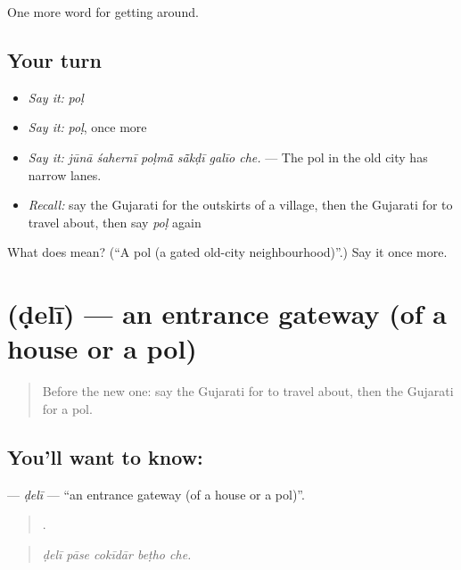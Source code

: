 \begin{grammarlens}[title={What you've built}]
One more word for getting around.
\end{grammarlens}

\subsection*{Your turn}
\begin{itemize}
\raggedright
  \item \emph{Say it:} \emph{poḷ}
  \item \emph{Say it:} \emph{poḷ}, once more
  \item \emph{Say it:} \emph{jūnā śahernī poḷmā̃ sā̃kḍī galīo che.} — The pol in the old city has narrow lanes.
  \item \emph{Recall:} say the Gujarati for the outskirts of a village, then the Gujarati for to travel about, then say \emph{poḷ} again
\end{itemize}

\begin{tcolorbox}[breakable,colback=teal!4,colframe=teal!35!black,title={Before you move on}]
What does  mean? (\textquotedblleft{}A pol (a gated old-city neighbourhood)\textquotedblright{}.) Say it once more.
\end{tcolorbox}
\section[\texorpdfstring{\gu{ડેલી} (ḍelī)}{ડેલી (ḍelī)}]{ (ḍelī) — an entrance gateway (of a house or a pol)}

\label{lesson:GU-C417-deli}



\begin{quote}
Before the new one: say the Gujarati for to travel about, then the Gujarati for a pol.
\end{quote}

\subsection*{You'll want to know: }
\textbf{} — \emph{ḍelī} — \textquotedblleft{}an entrance gateway (of a house or a pol)\textquotedblright{}.

\begin{quote}
    .
\end{quote}

\begin{quote}
\emph{ḍelī pāse cokīdār beṭho che.}
\end{quote}

